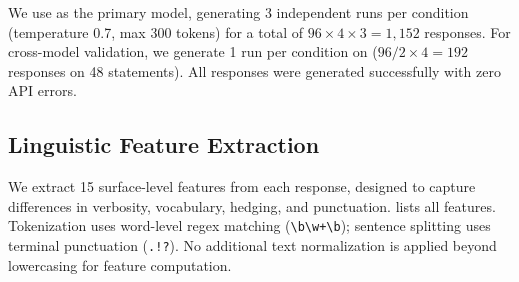 We use \gptfull as the primary model, generating 3 independent runs per condition (temperature 0.7, max 300 tokens) for a total of $96 \times 4 \times 3 = 1{,}152$ responses. For cross-model validation, we generate 1 run per condition on \gptmini ($96/2 \times 4 = 192$ responses on 48 statements). All responses were generated successfully with zero API errors.

\subsection{Linguistic Feature Extraction}
\label{sec:features}

We extract 15 surface-level features from each response, designed to capture differences in verbosity, vocabulary, hedging, and punctuation.  lists all features. Tokenization uses word-level regex matching (\texttt{\textbackslash b\textbackslash w+\textbackslash b}); sentence splitting uses terminal punctuation (\texttt{.!?}). No additional text normalization is applied beyond lowercasing for feature computation.

